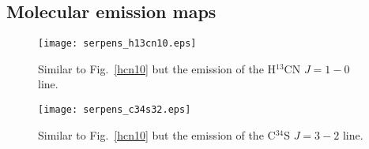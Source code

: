 \documentclass{aa}
\begin{document}
%
%

\begin{appendix} %
\section{Molecular emission maps}

\begin{figure}
\texttt{[image: serpens\_h13cn10.eps]}
\caption{Similar to Fig.~\ref{hcn10} but the emission of the H$^{13}$CN $J=1-0$ line.}
\label{h13cn10}
\end{figure}


\begin{figure}
\texttt{[image: serpens\_c34s32.eps]}
\caption{Similar to Fig.~\ref{hcn10} but the emission of the C$^{34}$S $J=3-2$ line.}
\label{c34s32}
\end{figure}

\end{appendix}
\end{document}
